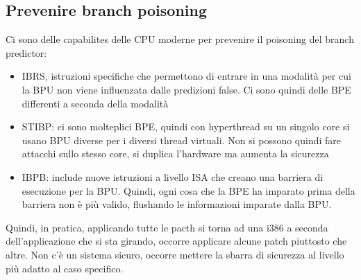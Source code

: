 \documentclass[12pt, oneside]{extbook} %
\begin{document}
\subsection{Prevenire branch poisoning}
Ci sono delle capabilites delle CPU moderne per prevenire il poisoning del branch predictor:
\begin{itemize}
\item IBRS, istruzioni specifiche che permettono di entrare in una modalità per cui la BPU non viene influenzata dalle predizioni false. Ci sono quindi delle BPE differenti a seconda della modalità
\item STIBP: ci sono molteplici BPE, quindi con hyperthread su un singolo core si usano BPU diverse per i diversi thread virtuali. Non si possono quindi fare attacchi sullo stesso core, si duplica l'hardware ma aumenta la sicurezza
\item IBPB: include nuove istruzioni a livello ISA che creano una barriera di esecuzione per la BPU. Quindi, ogni cosa che la BPE ha imparato prima della barriera non è più valido, flushando le informazioni imparate dalla BPU.
\end{itemize}
Quindi, in pratica, applicando tutte le pacth si torna ad una i386
a seconda dell'applicazione che si sta girando, occorre applicare alcune patch piuttosto che altre. Non c'è un sistema sicuro, occorre mettere la sbarra di sicurezza al livello più adatto al caso specifico.
\end{document}
